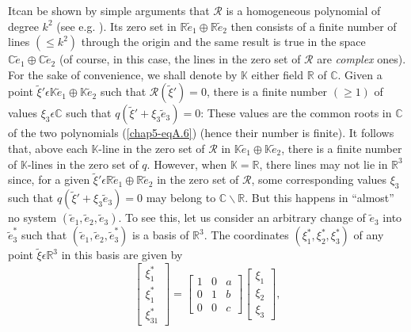 It\pageoriginale can be shown by simple arguments that $\mathscr{R}$ is a homogeneous polynomial of degree $k^{2}$ (see e.g. \cite{16, 18}). Its zero set in $\mathbb{R} \widetilde{e}_{1} \oplus \mathbb{R} \widetilde{e}_{2}$ then consists of a finite number of lines $(\leq k^{2})$ through the origin and the same result is true in the space $\mathbb{C} \widetilde{e}_{1} \oplus \mathbb{C} \widetilde{e}_{2}$ (of course, in this case, the lines in the zero set of $\mathscr{R}$ are {\em complex} ones). For the sake of convenience, we shall denote by $\mathbb{K}$ either field $\mathbb{R}$ of $\mathbb{C}$. Given a point $\widetilde{\xi}' \epsilon \mathbb{K} \widetilde{e}_{1} \oplus \mathbb{K} \widetilde{e}_{2}$ such that $\mathscr{R} (\widetilde{\xi}') = 0$, there is a finite number $(\geq 1)$ of values $\xi_{3} \epsilon \mathbb{C}$ such that $q(\widetilde{\xi}' + \xi_{3} \widetilde{e}_{3}) = 0$: These values are the common roots in $\mathbb{C}$ of the two polynomials (\ref{chap5-eqA.6}) (hence their number is finite). It follows that, above each $\mathbb{K}$-line in the zero set of $\mathscr{R}$ in $\mathbb{K} \widetilde{e}_{1} \oplus \mathbb{K} \widetilde{e}_{2}$, there is a finite number of $\mathbb{K}$-lines in the zero set of $q$. However, when $\mathbb{K} = \mathbb{R}$, there lines may not lie in $\mathbb{R}^{3}$ since, for a given $\widetilde{\xi}' \epsilon \mathbb{R} \widetilde{e}_{1} \oplus \mathbb{R} \widetilde{e}_{2}$ in the zero set of $\mathscr{R}$, some corresponding values $\xi_{3}$ such that $q(\widetilde{\xi}' + \xi_{3}\widetilde{e}_{3}) = 0$ may belong to $\mathbb{C} \backslash \mathbb{R}$. But this happens in ``almost'' no system $(\widetilde{e}_{1}, \widetilde{e}_{2}, \widetilde{e}_{3})$. To see this, let us consider an arbitrary change of $\widetilde{e}_{3}$ into $\widetilde{e}_{3}^{*}$ such that $(\widetilde{e}_{1}, \widetilde{e}_{2}, \widetilde{e}_{3}^{*})$ is a basis of $\mathbb{R}^{3}$. The coordinates $(\xi_{1}^{*}, \xi_{2}^{*}, \xi_{3}^{*})$ of any point $\widetilde{\xi} \epsilon \mathbb{R}^{3}$ in this basis are given by
\begin{equation*}
\begin{bmatrix}
\xi_{1}^{*}\\
\xi_{1}^{*}\\
\xi_{31}^{*}
\end{bmatrix}
=
\begin{bmatrix}
1 & 0 & a\\
0 & 1 & b\\
0 & 0 & c
\end{bmatrix}
\begin{bmatrix}
\xi_{1}\\
\xi_{2}\\
\xi_{3}
\end{bmatrix}
,\tag{A.7}\label{chap5-eqA.7}
\end{equation*}
